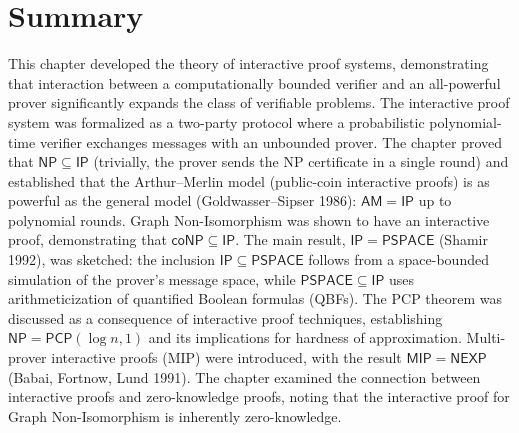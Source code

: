 \section{Summary}
\label{sec:ip:summary}

This chapter developed the theory of interactive proof systems, demonstrating that interaction between a computationally bounded verifier and an all-powerful prover significantly expands the class of verifiable problems. The interactive proof system was formalized as a two-party protocol where a probabilistic polynomial-time verifier exchanges messages with an unbounded prover. The chapter proved that $\mathsf{NP} \subseteq \mathsf{IP}$ (trivially, the prover sends the NP certificate in a single round) and established that the Arthur--Merlin model (public-coin interactive proofs) is as powerful as the general model (Goldwasser--Sipser 1986): $\mathsf{AM} = \mathsf{IP}$ up to polynomial rounds. Graph Non-Isomorphism was shown to have an interactive proof, demonstrating that $\mathsf{coNP} \subseteq \mathsf{IP}$. The main result, $\mathsf{IP} = \mathsf{PSPACE}$ (Shamir 1992), was sketched: the inclusion $\mathsf{IP} \subseteq \mathsf{PSPACE}$ follows from a space-bounded simulation of the prover's message space, while $\mathsf{PSPACE} \subseteq \mathsf{IP}$ uses arithmeticization of quantified Boolean formulas (QBFs). The PCP theorem was discussed as a consequence of interactive proof techniques, establishing $\mathsf{NP} = \mathsf{PCP}(\log n, 1)$ and its implications for hardness of approximation. Multi-prover interactive proofs (MIP) were introduced, with the result $\mathsf{MIP} = \mathsf{NEXP}$ (Babai, Fortnow, Lund 1991). The chapter examined the connection between interactive proofs and zero-knowledge proofs, noting that the interactive proof for Graph Non-Isomorphism is inherently zero-knowledge.

